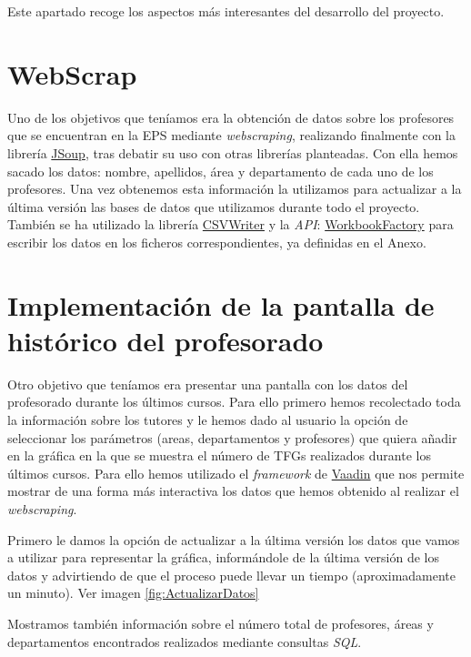 
Este apartado recoge los aspectos más interesantes del desarrollo del proyecto.

\section{WebScrap}

Uno de los objetivos que teníamos era la obtención de datos sobre los profesores que se encuentran en la EPS mediante \emph{webscraping}, realizando finalmente con la librería \href{https://jsoup.org/}{JSoup}, tras debatir su uso con otras librerías planteadas. 
Con ella hemos sacado los datos: nombre, apellidos, área y departamento de cada uno de los profesores. Una vez obtenemos esta información la utilizamos para actualizar a la última versión las bases de datos que utilizamos durante todo el proyecto.
También se ha utilizado la librería \href{https://opencsv.sourceforge.net/apidocs/com/opencsv/CSVWriter.html}{CSVWriter} y la \emph{API}: \href{https://poi.apache.org/apidocs/dev/org/apache/poi/ss/usermodel/WorkbookFactory.html}{WorkbookFactory} para escribir los datos en los ficheros correspondientes, ya definidas en el Anexo.

\section{Implementación de la pantalla de histórico del profesorado}
Otro objetivo que teníamos era presentar una pantalla con los datos del profesorado durante los últimos cursos. 
Para ello primero hemos recolectado toda la información sobre los tutores y le hemos dado al usuario la opción de seleccionar los parámetros (areas, departamentos y profesores) que quiera añadir en la gráfica en la que se muestra el número de TFGs realizados durante los últimos cursos.
Para ello hemos utilizado el \emph{framework} de \href{https://vaadin.com/}{Vaadin} que nos permite mostrar de una forma más interactiva los datos que hemos obtenido al realizar el \emph{webscraping}.

Primero le damos la opción de actualizar a la última versión los datos que vamos a utilizar para representar la gráfica, informándole de la última versión de los datos y advirtiendo de que el proceso puede llevar un tiempo (aproximadamente un minuto). Ver imagen \ref{fig:ActualizarDatos}

Mostramos también información sobre el número total de profesores, áreas y departamentos encontrados realizados mediante consultas \emph{SQL}.

